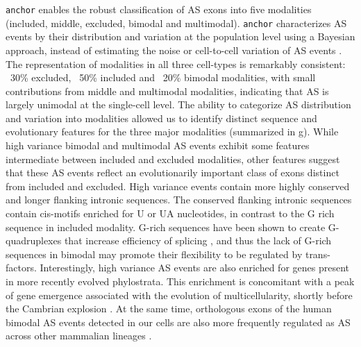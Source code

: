 \texttt{anchor} enables the robust classification of AS exons into five modalities (included, middle, excluded, bimodal and multimodal). \texttt{anchor} characterizes AS events by their distribution and variation at the population level using a Bayesian approach, instead of estimating the noise or cell-to-cell variation of AS events \cite{Marinov2014-iw}.  The representation of modalities in all three cell-types is remarkably consistent: ~30\% excluded, ~50\% included and ~20\% bimodal modalities, with small contributions from middle and multimodal modalities, indicating that AS is largely unimodal at the single-cell level. The ability to categorize AS distribution and variation into modalities allowed us to identify distinct sequence and evolutionary features for the three major modalities (summarized in g). While high variance bimodal and multimodal AS events exhibit some features intermediate between included and excluded modalities, other features suggest that these AS events reflect an evolutionarily important class of exons distinct from included and excluded. High variance events contain more highly conserved and longer flanking intronic sequences. The conserved flanking intronic sequences contain cis-motifs enriched for U or UA nucleotides, in contrast to the G rich sequence in included modality. G-rich sequences have been shown to create G-quadruplexes that increase efficiency of splicing \cite{Marcel2011-ll,Ribeiro2015-kb,Zizza2016-ln}, and thus the lack of G-rich sequences in bimodal may promote their flexibility to be regulated by trans-factors. Interestingly, high variance AS events are also enriched for genes present in more recently evolved phylostrata. This enrichment is concomitant with a peak of gene emergence associated with the evolution of multicellularity, shortly before the Cambrian explosion \cite{DomazetLoso:2008ba}. At the same time, orthologous exons of the human bimodal AS events detected in our cells are also more frequently regulated as AS across other mammalian lineages \cite{Merkin:2012hv,BarbosaMorais:2012crb}.

